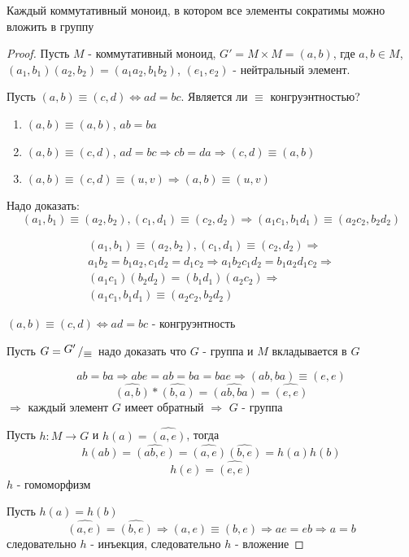 \documentclass[../main/document.tex]{subfiles}
\begin{document}
\begin{thm}
Каждый коммутативный моноид, в котором все элементы сократимы можно вложить в группу
\begin{proof}
Пусть $M$ - коммутативный моноид, $G'=M\times M=(a,b)$, где $a,b\in M$, $(a_1,b_1)(a_2,b_2)=(a_1a_2,b_1b_2)$, $(e_1,e_2)$ - нейтральный элемент.

Пусть $(a,b)\equiv (c,d)\Leftrightarrow ad=bc$. Является ли $\equiv$ конгруэнтностью?

\begin{enumerate}
\item $(a,b)\equiv(a,b)$, $ab=ba$
\item $(a,b)\equiv(c,d)$, $ad=bc\Rightarrow cb=da\Rightarrow (c,d)\equiv (a,b)$ 
\item $(a,b)\equiv(c,d)\equiv(u,v)\Rightarrow(a,b)\equiv(u,v)$
\end{enumerate}

Надо доказать:
$$(a_1,b_1)\equiv(a_2,b_2), (c_1,d_1)\equiv(c_2,d_2)\Rightarrow(a_1c_1,b_1d_1)\equiv(a_2c_2,b_2d_2)$$

\begin{multline*}
(a_1,b_1)\equiv(a_2,b_2), (c_1,d_1)\equiv(c_2,d_2)\Rightarrow \\ 
a_1b_2=b_1a_2, c_1d_2=d_1c_2\Rightarrow a_1b_2c_1d_2=b_1a_2d_1c_2\Rightarrow \\
 (a_1c_1)(b_2d_2)=(b_1d_1)(a_2c_2)\Rightarrow \\
 (a_1c_1,b_1d_1)\equiv(a_2c_2,b_2d_2)
\end{multline*}

$(a,b)\equiv (c,d)\Leftrightarrow ad=bc$ - конгруэнтность
\vspace{1em}

Пусть $G = \bigslant{G'}{\equiv}$ надо доказать что $G$ - группа и $M$ вкладывается в $G$

$$ab=ba\Rightarrow abe=ab=ba=bae\Rightarrow (ab,ba)\equiv(e,e)$$
$$\widehat{(a,b)}*\widehat{(b,a)}=\widehat{(ab,ba)}=\widehat{(e,e)}$$
$\Rightarrow$ каждый элемент $G$ имеет обратный $\Rightarrow$ $G$ - группа

Пусть $h:M\rightarrow G$ и $h(a)=\widehat{(a,e)}$, тогда
$$h(ab)=\widehat{(ab,e)}=\widehat{(a,e)}\widehat{(b,e)}=h(a)h(b)$$
$$h(e)=\widehat{(e,e)}$$
$h$ - гомоморфизм

Пусть $h(a)=h(b)$
$$\widehat{(a,e)}=\widehat{(b,e)}\Rightarrow (a,e)\equiv(b,e)\Rightarrow ae=eb \Rightarrow a=b$$
следовательно $h$ - инъекция, следовательно $h$ - вложение

\end{proof}
\end{thm}
\end{document}
